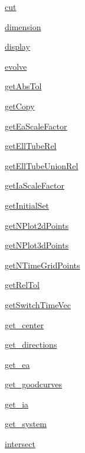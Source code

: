 \begin{list}{}{}
 \item \hyperref[method:elltool.reach.AReach.cut]{cut}
 \item \hyperref[method:elltool.reach.AReach.dimension]{dimension}
 \item \hyperref[method:elltool.reach.AReach.display]{display}
 \item \hyperref[method:elltool.reach.AReach.evolve]{evolve}
 \item \hyperref[method:elltool.reach.AReach.getAbsTol]{getAbsTol}
 \item \hyperref[method:elltool.reach.AReach.getCopy]{getCopy}
 \item \hyperref[method:elltool.reach.AReach.getEaScaleFactor]{getEaScaleFactor}
 \item \hyperref[method:elltool.reach.AReach.getEllTubeRel]{getEllTubeRel}
 \item \hyperref[method:elltool.reach.AReach.getEllTubeUnionRel]{getEllTubeUnionRel}
 \item \hyperref[method:elltool.reach.AReach.getIaScaleFactor]{getIaScaleFactor}
 \item \hyperref[method:elltool.reach.AReach.getInitialSet]{getInitialSet}
 \item \hyperref[method:elltool.reach.AReach.getNPlot2dPoints]{getNPlot2dPoints}
 \item \hyperref[method:elltool.reach.AReach.getNPlot3dPoints]{getNPlot3dPoints}
 \item \hyperref[method:elltool.reach.AReach.getNTimeGridPoints]{getNTimeGridPoints}
 \item \hyperref[method:elltool.reach.AReach.getRelTol]{getRelTol}
 \item \hyperref[method:elltool.reach.AReach.getSwitchTimeVec]{getSwitchTimeVec}
 \item \hyperref[method:elltool.reach.AReach.get_center]{get\_center}
 \item \hyperref[method:elltool.reach.AReach.get_directions]{get\_directions}
 \item \hyperref[method:elltool.reach.AReach.get_ea]{get\_ea}
 \item \hyperref[method:elltool.reach.AReach.get_goodcurves]{get\_goodcurves}
 \item \hyperref[method:elltool.reach.AReach.get_ia]{get\_ia}
 \item \hyperref[method:elltool.reach.AReach.get_system]{get\_system}
 \item \hyperref[method:elltool.reach.AReach.intersect]{intersect}

\end{list}

